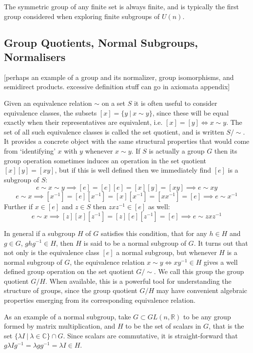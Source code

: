The symmetric group of any finite set is always finite, and is typically the first group considered when exploring finite subgroups of $U(n)$.
\subsection{Group Quotients, Normal Subgroups, Normalisers}
[perhaps an example of a group and its normalizer, group isomorphisms, and semidirect products. excessive definition stuff can go in axiomata appendix]

Given an equivalence relation $\sim$ on a set $S$ it is often useful to consider equivalence classes, the subsets $[x] = \{y\ |\ x \sim y\}$, since these will be equal exactly when their representatives are equivalent, i.e. $[x] = [y] \iff x \sim y$. The set of all such equivalence classes is called the set quotient, and is written $S/\sim$. It provides a concrete object with the same structural properties that would come from `identifying' $x$ with $y$ whenever $x \sim y$. If $S$ is actually a group $G$ then its group operation sometimes induces an operation in the set quotient $[x][y] = [xy]$, but if this is well defined then we immediately find $[e]$ is a subgroup of $S$:
\[e \sim x \sim y \implies [e] = [e][e] = [x][y] = [xy] \implies e \sim xy\]
\[e \sim x \implies [x^{-1}] = [e][x^{-1}] = [x][x^{-1}] = [xx^{-1}] = [e] \implies e \sim x^{-1}\]
Further if $x \in [e]$ and $z \in S$ then $zxz^{-1} \in [e]$ as well:
\[e \sim x \implies [z][x][z^{-1}] = [z][e][z^{-1}] = [e] \implies e \sim zxz^{-1}\]

In general if a subgroup $H$ of $G$ satisfies this condition, that for any $h \in H$ and $g \in G$, $ghg^{-1} \in H$, then $H$ is said to be a normal subgroup of $G$. It turns out that not only is the equivalence class $[e]$ a normal subgroup, but whenever $H$ is a normal subgroup of $G$, the equivalence relation $x \sim y \iff xy^{-1} \in H$ gives a well defined group operation on the set quotient $G/\sim$. We call this group the group quotient $G/H$. When available, this is a powerful tool for understanding the structure of groups, since the group quotient $G/H$ may have convenient algebraic properties emerging from its corresponding equivalence relation.

As an example of a normal subgroup, take $G \subset GL(n, \mathbb{R})$ to be any group formed by matrix multiplication, and $H$ to be the set of scalars in $G$, that is the set $\{\lambda I\ |\ \lambda \in \mathbb{C}\} \cap G$. Since scalars are commutative, it is straight-forward that $g\lambda I g^{-1} = \lambda gg^{-1} = \lambda I \in H$.


